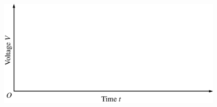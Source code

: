 \begin{parts}
\begin{figure}[h]
\centering
\includegraphics[scale=0.3]{images/img-017-032.png}
\end{figure}


\end{parts}
